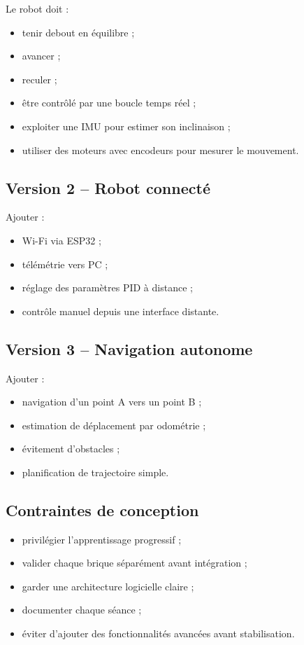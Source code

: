 \documentclass[11pt,a4paper]{article}
\begin{document}
	Le robot doit :
	
	\begin{itemize}
		\item tenir debout en équilibre ;
		\item avancer ;
		\item reculer ;
		\item être contrôlé par une boucle temps réel ;
		\item exploiter une IMU pour estimer son inclinaison ;
		\item utiliser des moteurs avec encodeurs pour mesurer le mouvement.
	\end{itemize}
	
	\subsection*{Version 2 -- Robot connecté}
	
	Ajouter :
	
	\begin{itemize}
		\item Wi-Fi via ESP32 ;
		\item télémétrie vers PC ;
		\item réglage des paramètres PID à distance ;
		\item contrôle manuel depuis une interface distante.
	\end{itemize}
	
	\subsection*{Version 3 -- Navigation autonome}
	
	Ajouter :
	
	\begin{itemize}
		\item navigation d'un point A vers un point B ;
		\item estimation de déplacement par odométrie ;
		\item évitement d'obstacles ;
		\item planification de trajectoire simple.
	\end{itemize}
	
	\subsection*{Contraintes de conception}
	
	\begin{itemize}
		\item privilégier l'apprentissage progressif ;
		\item valider chaque brique séparément avant intégration ;
		\item garder une architecture logicielle claire ;
		\item documenter chaque séance ;
		\item éviter d'ajouter des fonctionnalités avancées avant stabilisation.
	\end{itemize}
	
\end{document}
